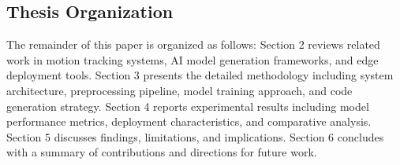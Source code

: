 \subsection{Thesis Organization}

The remainder of this paper is organized as follows: Section 2 reviews related work in motion tracking systems, AI model generation frameworks, and edge deployment tools. Section 3 presents the detailed methodology including system architecture, preprocessing pipeline, model training approach, and code generation strategy. Section 4 reports experimental results including model performance metrics, deployment characteristics, and comparative analysis. Section 5 discusses findings, limitations, and implications. Section 6 concludes with a summary of contributions and directions for future work.